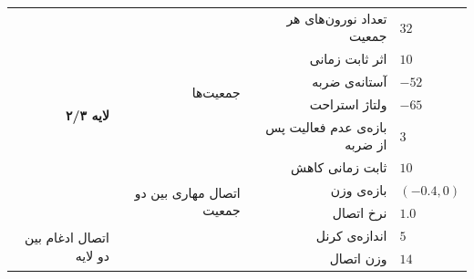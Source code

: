 \documentclass[12pt]{report}
\begin{document}
\begin{table}[p]
{\begin{tabular}{|rrrl|}
		\multicolumn{1}{|r|}{\multirow{8}{*}{\textbf{لایه ۲/۳}}}        & \multicolumn{1}{r|}{\multirow{6}{*}{جمعیت‌ها}}                 & \multicolumn{1}{r|}{تعداد نورون‌های هر جمعیت}             & $32$ \\ \cline{3-4} 
		\multicolumn{1}{|r|}{}                                          & \multicolumn{1}{r|}{}                                          & \multicolumn{1}{r|}{اثر ثابت زمانی} & $10$                      \\ \cline{3-4} 
		\multicolumn{1}{|r|}{}                                          & \multicolumn{1}{r|}{}                                          & \multicolumn{1}{r|}{آستانه‌ی ضربه}                        & $-52$                     \\ \cline{3-4} 
		\multicolumn{1}{|r|}{}                                          & \multicolumn{1}{r|}{}                                          & \multicolumn{1}{r|}{ولتاژ استراحت}                        & $-65$                     \\ \cline{3-4} 
		\multicolumn{1}{|r|}{}                                          & \multicolumn{1}{r|}{}                                          & \multicolumn{1}{r|}{بازه‌ی عدم فعالیت پس از ضربه}         & $3$                       \\ \cline{3-4} 
		\multicolumn{1}{|r|}{}                                          & \multicolumn{1}{r|}{}                                          & \multicolumn{1}{r|}{ثابت زمانی کاهش}                      & $10$                      \\ \cline{2-4} 
		\multicolumn{1}{|r|}{}                                          & \multicolumn{1}{r|}{\multirow{2}{*}{اتصال مهاری بین دو جمعیت}} & \multicolumn{1}{r|}{بازه‌ی وزن}                           & $(-0.4,0)$                \\ \cline{3-4} 
		\multicolumn{1}{|r|}{}                                          & \multicolumn{1}{r|}{}                                          & \multicolumn{1}{r|}{نرخ اتصال}                            & $1.0$                     \\ \hline
		\multicolumn{1}{|r|}{\multirow{3}{*}{اتصال ادغام بین دو لایه}} & \multicolumn{2}{r|}{اندازه‌ی کرنل}                                                                                         & $5$                       \\ \cline{2-4} 
		\multicolumn{1}{|r|}{}                                          & \multicolumn{2}{r|}{وزن اتصال}                                                                                             & $14$                      \\ \cline{2-4} 

\end{tabular}}
\end{table}
\end{document}
